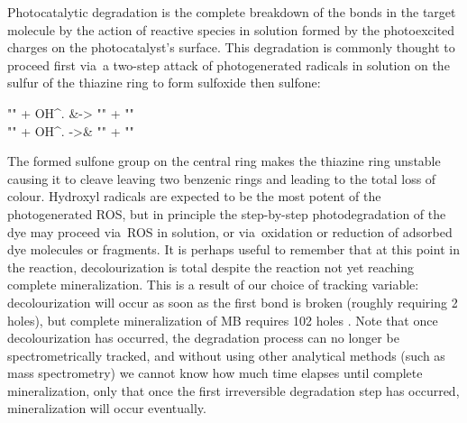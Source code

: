 \documentclass[webedition,openright,titles,swedish,english]{LuaUUThesis}\usepackage[]{graphicx}\usepackage[]{xcolor}
\makeatletter
\newcommand{\via}{via}
\newenvironment{subreactions}{%
   \refstepcounter{reaction}%
   \protected@edef\theparentequation{\thereaction}%
   \setcounter{parentequation}{\value{reaction}}%
   \setcounter{reaction}{0}%
   \def\thereaction{\theparentequation\alph{reaction}}%
   \ignorespaces
}{%
   \setcounter{reaction}{\value{parentequation}}%
   \ignorespacesafterend
}
\renewcommand*\printatom[1]{\ensuremath{\mathsf{#1}}}
\makeatother
\begin{document}
Photocatalytic degradation is the complete breakdown of the bonds in the target molecule
by the action of reactive species in solution formed by the photoexcited charges
on the photocatalyst's surface.
This degradation is commonly thought to proceed first \via\ a two-step attack of photogenerated
 radicals in solution on the sulfur of the thiazine ring to form
sulfoxide then sulfone:
\renewcommand*\printatom[1]{\ensuremath{\mathrm{#1}}}
\begin{subreactions}\begin{reactions}%
"" + OH^. &-> "" + \proton{}  "\label{rxn:PC-MB-sulfoxide}" \\%
"" + OH^. ->&  "" + \proton{}  "\label{rxn:PC-MB-sulfone}"%
\end{reactions}\end{subreactions}%
\renewcommand*\printatom[1]{\ensuremath{\mathsf{#1}}}
The formed sulfone group on the central ring makes the thiazine ring unstable causing it to
cleave leaving two benzenic rings and leading to the total loss of colour.
Hydroxyl radicals are expected to be the most potent of the photogenerated \gls{ROS},
but in principle the step-by-step photodegradation of the dye may proceed \via\ \gls{ROS}
in solution, or \via\ oxidation or reduction of adsorbed dye molecules or fragments.
It is perhaps useful to remember that at this point in the reaction, decolourization is total
despite the reaction not yet reaching complete mineralization. This is a result of our
choice of tracking variable: decolourization will occur as soon as the first bond is broken
(roughly requiring 2 holes), but complete mineralization of \gls{MB} requires
\num{102} holes \cite{Mills1999}.
Note that once decolourization has occurred, the degradation process can no longer
be spectrometrically tracked, and without using other analytical methods (such as
mass spectrometry) we cannot know how much time elapses until complete mineralization,
only that once the first irreversible degradation step has occurred,
mineralization will occur eventually.
\end{document}
